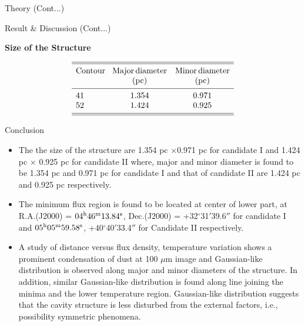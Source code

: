 \documentclass[12pt,a4paper]{beamer}
\begin{document}
\begin{frame}{Theory (Cont...)}
\begin{frame}{Result \& Discussion   (Cont...)}
\begin{block}{\centering\textbf{Size of the Structure \vspace*{.05cm}}}
\begin{itemize}
 \begin {table}[h]
$$
\begin{array}{p{0.1\linewidth}cccccc}
            \hline
            \hline
            \noalign{\smallskip}
            Contour&{\rm Major\,diameter}&{\rm Minor\,diameter}\\
            & {\rm (pc)}&{\rm (pc)}\\
            \noalign{\smallskip}
            \hline
            \noalign{\smallskip}
            41 & 1.354 & 0.971\\
            52 & 1.424 & 0.925\\
             \noalign{\smallskip}
            \hline
            \hline
         \end{array}
     $$
        \end{table}
\end{itemize}
\end{block}
\end{frame}




        \begin{frame}
\begin{center}
\Large\bf\color{red}{Conclusions}
\end{center}
\end{frame}



\begin{frame}{Conclusion}
\begin{itemize}
\item The  the size of the structure are 1.354 pc $\times$0.971 pc
for candidate I and  1.424 pc $\times$ 0.925 pc for candidate II
where, major and minor diameter is found to be 1.354 pc and 0.971
pc for candidate I and that of candidate II are 1.424 pc and 0.925
pc respectively. \item The minimum flux region is found to be
located at center of lower part, at R.A.(J2000) = $04^{\rm
h}46^{\rm m}13.84^{\rm s}$, Dec.(J2000) =
+32$^{\circ}$31${'}$39.6${''}$ for candidate I and $05^{\rm
h}05^{\rm m}59.58^{\rm s}$, +40$^{\circ}$40${'}$33.4${''}$ for
Candidate II respectively.
 \item A study of distance versus flux density, temperature
variation shows a prominent condensation of dust at 100 $\mu$m
image and Gaussian-like distribution is observed along major and
minor diameters of the structure. In addition, similar
Gaussian-like distribution is found along line joining the minima
and the lower temperature region. Gaussian-like distribution
suggests that the cavity structure is less disturbed from the
external factors, i.e., possibility symmetric phenomena.


\end{itemize}
\end{frame}
\end{frame}
\end{document}
